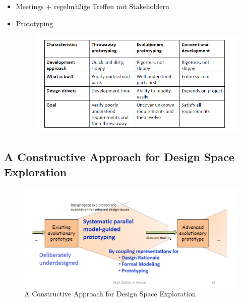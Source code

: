 \begin{itemize}
	\item Meetings + regelmäßige Treffen mit Stakeholdern
	
	\item Prototyping
	\begin{figure}[!h]
		\centering
		\includegraphics[scale=0.7]{img/prototyping_overview.png}
	\end{figure}
\end{itemize}

\subsection{A Constructive Approach for Design Space Exploration}
\begin{figure}[!h]
	\centering
	\includegraphics[scale=0.7]{img/constructive_approach.png}
	\caption{A Constructive Approach for Design Space Exploration}
\end{figure}
	

